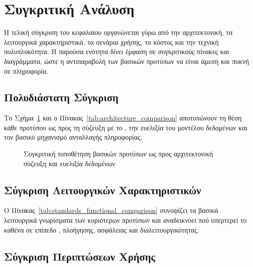 \section{Συγκριτική Ανάλυση  }
\label{sec:comparative_analysis}

Η τελική σύγκριση του κεφαλαίου οργανώνεται γύρω από την αρχιτεκτονική, τα λειτουργικά χαρακτηριστικά, τα σενάρια χρήσης, το κόστος και την τεχνική πολυπλοκότητα. Η παρούσα ενότητα δίνει έμφαση σε συγκριτικούς πίνακες και διαγράμματα, ώστε η αντιπαραβολή των βασικών προτύπων να είναι άμεση και πυκνή σε πληροφορία.

\subsection{Πολυδιάστατη Σύγκριση}
\label{subsec:multidimensional_comparison}

Το Σχήμα~\ref{fig:standards_positioning} και ο Πίνακας~\ref{tab:architecture_comparison} αποτυπώνουν τη θέση κάθε προτύπου ως προς τη σύζευξη με το , την ευελιξία του μοντέλου δεδομένων και τον βασικό μηχανισμό ανταλλαγής πληροφορίας.

\begin{figure}[H]
  \centering
  
  \caption{Συγκριτική τοποθέτηση βασικών προτύπων ως προς αρχιτεκτονική σύζευξη και ευελιξία δεδομένων}
  \label{fig:standards_positioning}
\end{figure}



\subsection{Σύγκριση Λειτουργικών Χαρακτηριστικών}
\label{subsec:functional_comparison}

Ο Πίνακας~\ref{tab:standards_functional_comparison} συνοψίζει τα βασικά λειτουργικά γνωρίσματα των κυριότερων προτύπων και αναδεικνύει πού υπερτερεί το καθένα σε επίπεδο , πλοήγησης, ασφάλειας και διαλειτουργικότητας.



\subsection{Σύγκριση Περιπτώσεων Χρήσης}
\label{subsec:use_case_comparison}

